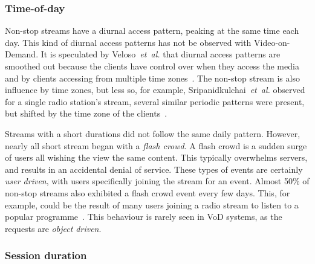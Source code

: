 
\subsubsection{Time-of-day}


    Non-stop streams have a diurnal access pattern, peaking at the same time each day. This kind of diurnal access patterns has not be observed with Video-on-Demand. It is speculated by Veloso~\emph{et~al.} that diurnal access patterns are smoothed out because the clients have control over when they access the media and by clients accessing from multiple time zones~\cite{veloso2006hcl}. The non-stop stream is also influence by time zones, but less so, for example, Sripanidkulchai~\emph{et~al.} observed for a single radio station's stream, several similar periodic patterns were present, but shifted by the time zone of the clients~\cite{sripanidkulchai2004als}.


    Streams with a short durations did not follow the same daily pattern. However, nearly all short stream began with a \emph{flash crowd}. A flash crowd is a sudden surge of users all wishing the view the same content. This typically overwhelms servers, and results in an accidental denial of service. These types of events are certainly \emph{user driven}, with users specifically joining the stream for an event. Almost 50\% of non-stop streams also exhibited a flash crowd event every few days. This, for example, could be the result of many users joining a radio stream to listen to a popular programme~\cite{sripanidkulchai2004als}. This behaviour is rarely seen in VoD systems, as the requests are \emph{object driven}.

\subsubsection{Session duration}

